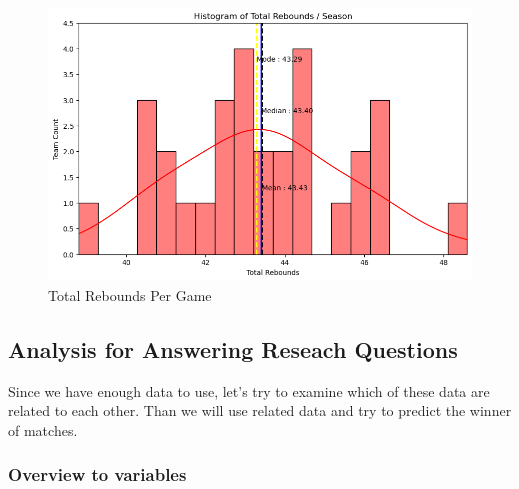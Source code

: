 \documentclass[conference]{IEEEtran}
\begin{document}
\begin{figure}[h]
    \centering
    \includegraphics[scale=0.41]{TRB_image.png}
    \caption{Total Rebounds Per Game}
    \label{fig:enter-label}
\end{figure}
\vspace{\baselineskip}
\vspace{\baselineskip}

\vspace{\baselineskip}
\vspace{\baselineskip}
\vspace{\baselineskip}

\subsection{Analysis for Answering Reseach Questions}


Since we have enough data to use, let’s try to examine which
of these data are related to each other. Than we will use related
data and try to predict the winner of matches.
\vspace{\baselineskip}
\vspace{\baselineskip}
\vspace{\baselineskip}
\vspace{\baselineskip}


\subsubsection{Overview to variables}
\end{document}
